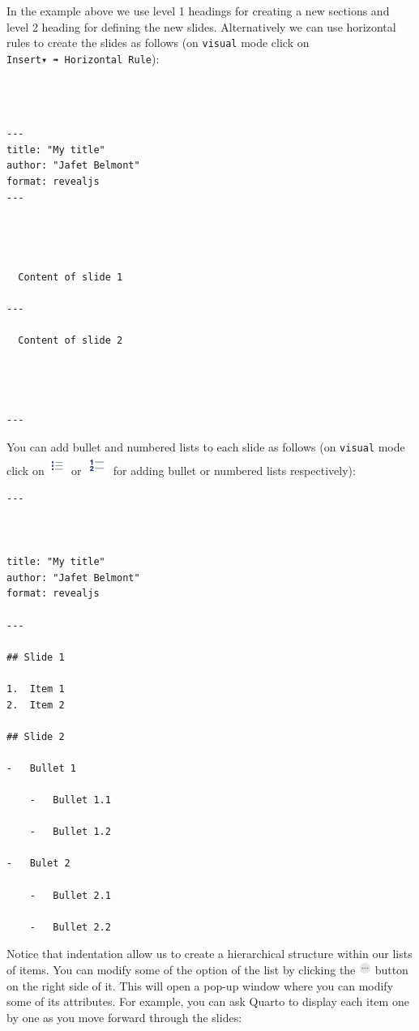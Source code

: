 \documentclass[
  letterpaper,
  DIV=11,
  numbers=noendperiod]{scrartcl}
\begin{document}
In the example above we use level 1 headings for creating a new sections
and level 2 heading for defining the new slides. Alternatively we can
use horizontal rules to create the slides as follows (on \texttt{visual}
mode click on \texttt{Insert▾\ ➠\ Horizontal\ Rule}):

\begin{verbatim}



---
title: "My title"
author: "Jafet Belmont"
format: revealjs
---




  Content of slide 1

---

  Content of slide 2




---
\end{verbatim}

You can add bullet and numbered lists to each slide as follows (on
\texttt{visual} mode click on
\includegraphics[width=0.25in,height=0.26042in]{images/bullets.png} or
\includegraphics[width=0.3125in,height=0.26042in]{images/numbered.png}
for adding bullet or numbered lists respectively):

\begin{verbatim}
---



title: "My title"
author: "Jafet Belmont"
format: revealjs

---

## Slide 1

1.  Item 1
2.  Item 2

## Slide 2

-   Bullet 1

    -   Bullet 1.1

    -   Bullet 1.2

-   Bulet 2

    -   Bullet 2.1

    -   Bullet 2.2
\end{verbatim}

Notice that indentation allow us to create a hierarchical structure
within our lists of items. You can modify some of the option of the list
by clicking the
\includegraphics[width=0.15625in,height=\textheight]{images/threedots.png}
button on the right side of it. This will open a pop-up window where you
can modify some of its attributes. For example, you can ask Quarto to
display each item one by one as you move forward through the slides:
\end{document}
